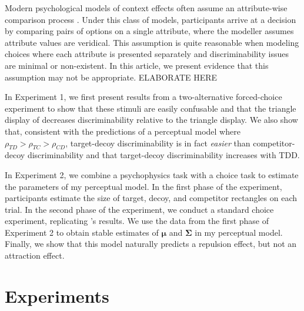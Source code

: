 \documentclass{umassthesis}          %
\begin{document}
Modern psychological models of context effects often assume an attribute-wise comparison process \parencite{roeMultialternativeDecisionField2001a,trueblood2013not,usherLossAversionInhibition2004a,bhatiaAssociationsAccumulationPreference2013b}. Under this class of models, participants arrive at a decision by comparing pairs of options on a single attribute, where the modeller assumes attribute values are veridical. This assumption is quite reasonable when modeling choices where each attribute is presented separately and discriminability issues are minimal or non-existent. In this article, we present evidence that this assumption may not be appropriate. ELABORATE HERE

In Experiment 1, we first present results from a two-alternative forced-choice experiment to show that these stimuli are easily confusable and that the triangle display of \textcite{spektorWhenGoodLooks2018b} decreases discriminability relative to the triangle display. We also show that, consistent with the predictions of a perceptual model where $\rho_{TD}>\rho_{TC}>\rho_{CD}$, target-decoy discriminability is in fact \textit{easier} than competitor-decoy discriminability and that target-decoy discriminability increases with TDD. 

In Experiment 2, we combine a psychophysics task with a choice task to estimate the parameters of my perceptual model. In the first phase of the experiment, participants estimate the size of target, decoy, and competitor rectangles on each trial. In the second phase of the experiment, we conduct a standard choice experiment, replicating \textcite{spektorWhenGoodLooks2018b}'s results. We use the data from the first phase of Experiment 2 to obtain stable estimates of  $\mathbf{\mu}$ and $\mathbf{\Sigma}$ in my perceptual model. Finally, we show that this model naturally predicts a repulsion effect, but not an attraction effect.  

\section{Experiments}
\end{document}
